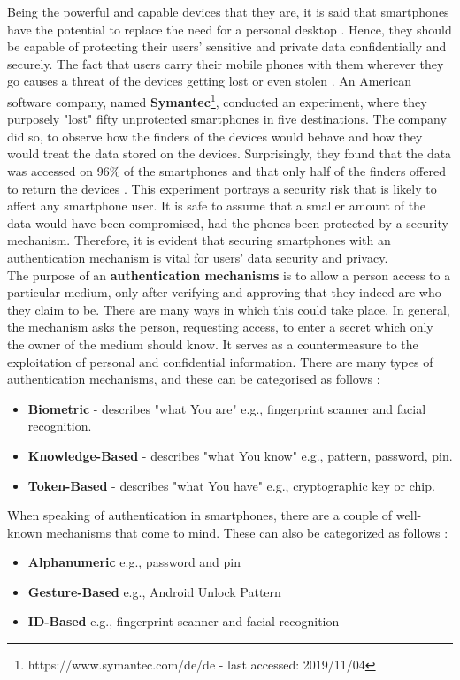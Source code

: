 Being the powerful and capable devices that they are, it is said that smartphones have the potential to replace the need for a personal desktop \cite{Alsaleh}. Hence, they should be capable of protecting their users' sensitive and private data confidentially and securely. The fact that users carry their mobile phones with them wherever they go causes a threat of the devices getting lost or even stolen \cite{Egelman:2014:YRL:2660267.2660273}. An American software company, named \textbf{Symantec}\footnote{https://www.symantec.com/de/de - last accessed: 2019/11/04}, conducted an experiment, where they purposely "lost" fifty unprotected smartphones in five destinations. The company did so, to observe how the finders of the devices would behave and how they would treat the data stored on the devices. Surprisingly, they found that the data was accessed on 96\% of the smartphones and that only half of the finders offered to return the devices \cite{symantec}.  This experiment portrays a security risk that is likely to affect any smartphone user.  It is safe to assume that a smaller amount of the data would have been compromised, had the phones been protected by a security mechanism. Therefore, it is evident that securing smartphones with an authentication mechanism is vital for users' data security and privacy.\\

The purpose of an \textbf{authentication mechanisms} is to allow a person access to a particular medium, only after verifying and approving that they indeed are who they claim to be. There are many ways in which this could take place. In general, the mechanism asks the person, requesting access, to enter a secret which only the owner of the medium should know. It serves as a countermeasure to the exploitation of personal and confidential information. There are many types of authentication mechanisms, and these can be categorised as follows \cite{gorman}: 
\begin{itemize}
    \item \textbf{Biometric} - describes "what You are" e.g., fingerprint scanner and facial recognition.
    \item \textbf{Knowledge-Based} - describes "what You know" e.g., pattern, password, pin.
    \item \textbf{Token-Based} - describes "what You have" e.g., cryptographic key or chip.
\end{itemize}


When speaking of authentication in smartphones, there are a couple of well-known mechanisms that come to mind. These can also be categorized as follows \cite{ediss20251,gorman} : 
\begin{itemize}
    \item \textbf{Alphanumeric} e.g., password and pin
    \item \textbf{Gesture-Based} e.g., Android Unlock Pattern
    \item \textbf{ID-Based} e.g., fingerprint scanner and facial recognition 
\end{itemize}

